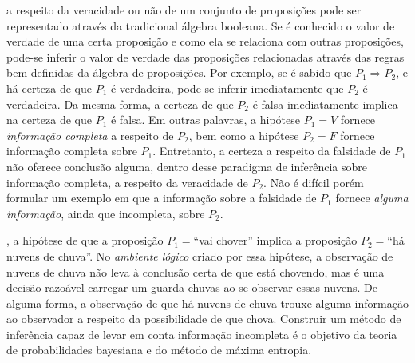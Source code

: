  a respeito da veracidade ou não de um conjunto de proposições pode ser representado através da tradicional álgebra booleana. Se é conhecido o valor de verdade de uma certa proposição e como ela se relaciona com outras proposições, pode-se inferir o valor de verdade das proposições relacionadas através das regras bem definidas da álgebra de proposições. Por exemplo, se é sabido que $P_{1} \Rightarrow P_{2}$, e há certeza de que $P_{1}$ é verdadeira, pode-se inferir imediatamente que $P_{2}$ é verdadeira. Da mesma forma, a certeza de que $P_{2}$ é falsa imediatamente implica na certeza de que $P_{1}$ é falsa. Em outras palavras, a hipótese $P_{1} = V$ fornece \textit{informação completa} a respeito de $P_{2}$, bem como a hipótese $P_{2} = F$ fornece informação completa sobre $P_1$. Entretanto, a certeza a respeito da falsidade de $P_{1}$ não oferece conclusão alguma, dentro desse paradigma de inferência sobre informação completa, a respeito da veracidade de $P_{2}$. Não é difícil porém formular um exemplo em que a informação sobre a falsidade de $P_{1}$ fornece \textit{alguma informação}, ainda que incompleta, sobre $P_{2}$. 

, a hipótese de que a proposição $P_{1} = $``vai chover'' implica a proposição $P_{2} =$``há nuvens de chuva''. No \textit{ambiente lógico} criado por essa hipótese, a observação de nuvens de chuva não leva à conclusão certa de que está chovendo, mas é uma decisão razoável carregar um guarda-chuvas ao se observar essas nuvens. De alguma forma, a observação de que há nuvens de chuva trouxe alguma informação ao observador a respeito da possibilidade de que chova. Construir um método de inferência capaz de levar em conta informação incompleta é o objetivo da teoria de probabilidades bayesiana e do método de máxima entropia. 

